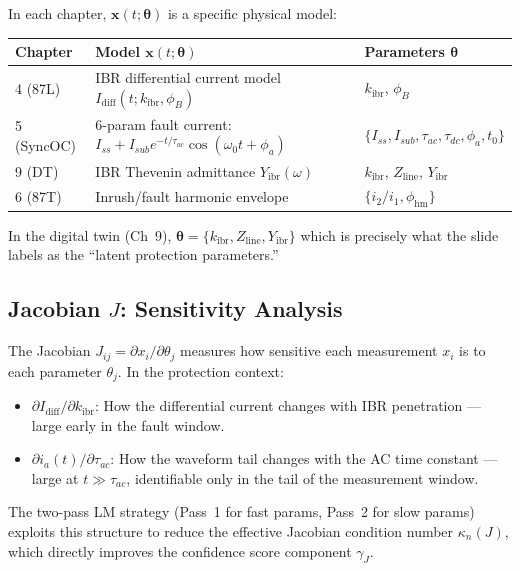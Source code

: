 \documentclass[12pt,a4paper]{article}
\newcommand{\kibr}{k_\mathrm{ibr}}
\begin{document}
In each chapter, $\mathbf{x}(t;\bm{\theta})$ is a specific physical model:

\begin{center}
\small
\begin{tabular}{@{}llp{5.5cm}@{}}
\toprule
\textbf{Chapter} & \textbf{Model $\mathbf{x}(t;\bm{\theta})$} & \textbf{Parameters $\bm{\theta}$} \\
\midrule
4 (87L)    & IBR differential current model $I_\mathrm{diff}(t;\kibr,\phi_B)$
             & $\kibr$, $\phi_B$ \\
5 (SyncOC) & 6-param fault current: $I_{ss} + I_{sub}e^{-t/\tau_{ac}}\cos(\omega_0 t+\phi_a)$
             & $\{I_{ss}, I_{sub}, \tau_{ac}, \tau_{dc}, \phi_a, t_0\}$ \\
9 (DT)     & IBR Thevenin admittance $Y_\mathrm{ibr}(\omega)$
             & $\kibr$, $Z_\mathrm{line}$, $Y_\mathrm{ibr}$ \\
6 (87T)    & Inrush/fault harmonic envelope
             & $\{i_2/i_1, \phi_\mathrm{hm}\}$ \\
\bottomrule
\end{tabular}
\end{center}

In the digital twin (Ch~9), $\bm{\theta} = \{\kibr, Z_\mathrm{line}, Y_\mathrm{ibr}\}$
which is precisely what the slide labels as the ``latent protection parameters.''

\subsection{Jacobian $J$: Sensitivity Analysis}

The Jacobian $J_{ij} = \partial x_i / \partial \theta_j$ measures how sensitive
each measurement $x_i$ is to each parameter $\theta_j$.  In the protection context:
\begin{itemize}[nosep]
  \item $\partial I_\mathrm{diff}/\partial \kibr$: How the differential current
        changes with IBR penetration --- large early in the fault window.
  \item $\partial i_a(t)/\partial \tau_{ac}$: How the waveform tail changes with the
        AC time constant --- large at $t \gg \tau_{ac}$, identifiable only in the
        tail of the measurement window.
\end{itemize}

The two-pass LM strategy (Pass~1 for fast params, Pass~2 for slow params) exploits
this structure to reduce the effective Jacobian condition number $\kappa_n(J)$,
which directly improves the confidence score component $\gamma_J$.
\end{document}
